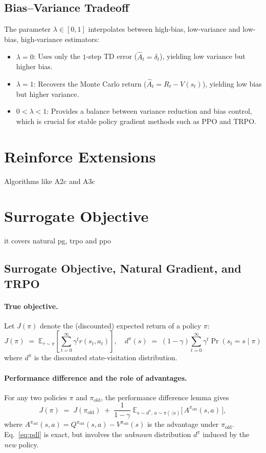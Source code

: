 \subsection{Bias--Variance Tradeoff}
The parameter $\lambda \in [0,1]$ interpolates between high-bias, low-variance and low-bias, high-variance estimators:
\begin{itemize}
    \item $\lambda=0$: Uses only the $1$-step TD error ($\hat{A}_t=\delta_t$), yielding low variance but higher bias.
    \item $\lambda=1$: Recovers the Monte Carlo return ($\hat{A}_t=R_t - V(s_t)$), yielding low bias but higher variance.
    \item $0 < \lambda < 1$: Provides a balance between variance reduction and bias control, which is crucial for stable policy gradient methods such as PPO and TRPO.
\end{itemize}


\section{Reinforce Extensions}

Algorithms like A2c and A3c

\section{Surrogate Objective}
it covers natural pg, trpo and ppo

\subsection{Surrogate Objective, Natural Gradient, and TRPO}

\paragraph{True objective.}
Let $J(\pi)$ denote the (discounted) expected return of a policy $\pi$:
\[
J(\pi) \;=\; \mathbb{E}_{\tau \sim \pi}\!\left[ \sum_{t=0}^{\infty} \gamma^t r(s_t,a_t) \right],
\quad
d^{\pi}(s) \;=\; (1-\gamma)\sum_{t=0}^{\infty} \gamma^t \Pr(s_t=s \mid \pi)
\]
where $d^{\pi}$ is the discounted state-visitation distribution.

\paragraph{Performance difference and the role of advantages.}
For any two policies $\pi$ and $\pi_{\text{old}}$, the performance difference lemma gives
\begin{equation}
\label{eq:pdl}
J(\pi)
\;=\;
J(\pi_{\text{old}})
\;+\;
\frac{1}{1-\gamma}\;
\mathbb{E}_{s \sim d^{\pi},\, a \sim \pi(\cdot|s)}
\!\big[\, A^{\pi_{\text{old}}}(s,a) \,\big],
\end{equation}
where $A^{\pi_{\text{old}}}(s,a) = Q^{\pi_{\text{old}}}(s,a)-V^{\pi_{\text{old}}}(s)$ is the advantage under $\pi_{\text{old}}$.
Eq.~\eqref{eq:pdl} is exact, but involves the \emph{unknown} distribution $d^{\pi}$ induced by the \emph{new} policy.




